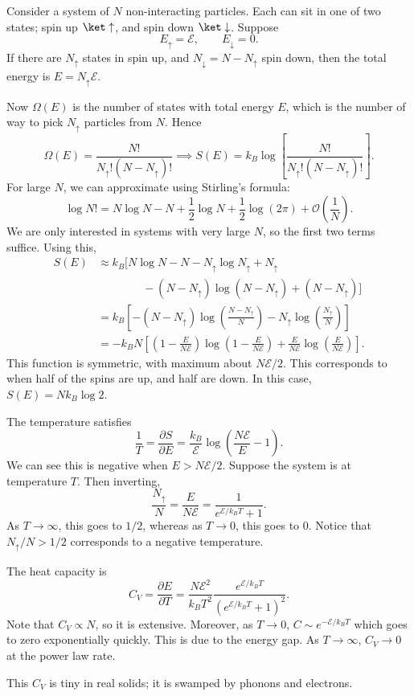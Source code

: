\documentclass[12pt]{article}
\begin{document}
\begin{exbox}
	Consider a system of $N$ non-interacting particles. Each can sit in one of two states; spin up $\ket \uparrow$, and spin down $\ket \downarrow$. Suppose
	\[
	E_\uparrow = \mathcal{E}, \qquad E_\downarrow = 0.
	\]
	If there are $N_\uparrow$ states in spin up, and $N_\downarrow = N - N_\uparrow$ spin down, then the total energy is $E = N_\uparrow \mathcal{E}$.

	Now $\Omega(E)$ is the number of states with total energy $E$, which is the number of way to pick $N_\uparrow$ particles from $N$. Hence
	\[
		\Omega(E) = \frac{N!}{N_\uparrow!(N - N_\uparrow)!} \implies S(E) = k_B \log \left[ \frac{N!}{N_\uparrow!(N-N_\uparrow)!}\right].
	\]
	For large $N$, we can approximate using Stirling's formula:
	\[
	\log N! = N \log N - N + \frac{1}{2} \log N + \frac{1}{2} \log (2 \pi) + \mathcal{O}\left( \frac1N\right).
	\]
	We are only interested in systems with very large $N$, so the first two terms suffice. Using this,
	\begin{align*}
		S(E) &\approx k_B \bigl[ N \log N - N - N_\uparrow \log N_\uparrow + N_\uparrow \\
		     & \qquad \qquad - (N-N_\uparrow)\log(N-N_\uparrow) + (N-N_\uparrow)\bigr] \\
		     &= k_B \left[ - (N - N_\uparrow) \log \left( \frac{N - N_\uparrow}{N} \right) - N_\uparrow \log \left( \frac{N_\uparrow}{N} \right) \right] \\
		     &= - k_B N \left[ \left( 1 - \frac{E}{N \mathcal{E}} \right) \log \left( 1 - \frac{E}{N \mathcal{E}} \right) + \frac{E}{N \mathcal{E}} \log \left(\frac{E}{N \mathcal{E}} \right)\right].
	\end{align*}
	This function is symmetric, with maximum about $N\mathcal{E}/2$. This corresponds to when half of the spins are up, and half are down. In this case, $S(E) = N k_B \log 2$.

	The temperature satisfies
	\[
	\frac{1}{T} = \frac{\partial S}{\partial E} = \frac{k_B}{\mathcal{E}} \log \left( \frac{N \mathcal{E}}{E} -1 \right).
	\]
	We can see this is negative when $E > N \mathcal{E}/2$. Suppose the system is at temperature $T$. Then inverting,
	\[
	\frac{N_\uparrow}{N} = \frac{E}{N \mathcal{E}} = \frac{1}{e^{\mathcal{E}/ k_B T} + 1}.
	\]
	As $T \to \infty$, this goes to $1/2$, whereas as $T \to 0$, this goes to $0$. Notice that $N_\uparrow/N > 1/2$ corresponds to a negative temperature.

	The heat capacity is
	\[
	C_V = \frac{\partial E}{\partial T} = \frac{N \mathcal{E}^2}{k_B T^2} \frac{e^{\mathcal{E}/k_BT}}{(e^{\mathcal{E}/k_BT} + 1)^2}.
	\]
	Note that $C_V \propto N$, so it is extensive. Moreover, as $T \to 0$, $C \sim e^{- \mathcal{E}/k_BT}$ which goes to zero exponentially quickly. This is due to the energy gap. As $T \to \infty$, $C_V \to 0$ at the power law rate.

	This $C_V$ is tiny in real solids; it is swamped by phonons and electrons.
\end{exbox}
\end{document}

